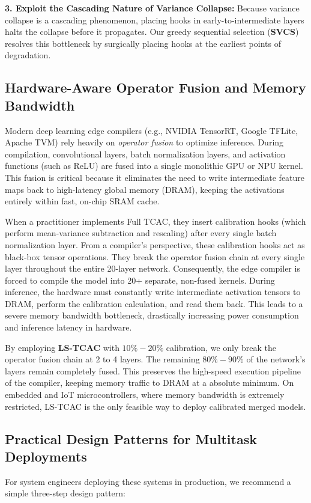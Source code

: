 \documentclass{article}
\theoremstyle{plain}
\theoremstyle{definition}
\theoremstyle{remark}
\begin{document}
\textbf{3. Exploit the Cascading Nature of Variance Collapse:} Because variance collapse is a cascading phenomenon, placing hooks in early-to-intermediate layers halts the collapse before it propagates. Our greedy sequential selection (\textbf{SVCS}) resolves this bottleneck by surgically placing hooks at the earliest points of degradation.

\subsection{Hardware-Aware Operator Fusion and Memory Bandwidth}
Modern deep learning edge compilers (e.g., NVIDIA TensorRT, Google TFLite, Apache TVM) rely heavily on \textit{operator fusion} to optimize inference. During compilation, convolutional layers, batch normalization layers, and activation functions (such as ReLU) are fused into a single monolithic GPU or NPU kernel. This fusion is critical because it eliminates the need to write intermediate feature maps back to high-latency global memory (DRAM), keeping the activations entirely within fast, on-chip SRAM cache.

When a practitioner implements Full TCAC, they insert calibration hooks (which perform mean-variance subtraction and rescaling) after every single batch normalization layer. From a compiler's perspective, these calibration hooks act as black-box tensor operations. They break the operator fusion chain at every single layer throughout the entire 20-layer network. Consequently, the edge compiler is forced to compile the model into 20+ separate, non-fused kernels. During inference, the hardware must constantly write intermediate activation tensors to DRAM, perform the calibration calculation, and read them back. This leads to a severe memory bandwidth bottleneck, drastically increasing power consumption and inference latency in hardware.

By employing \textbf{LS-TCAC} with $10\%-20\%$ calibration, we only break the operator fusion chain at 2 to 4 layers. The remaining $80\%-90\%$ of the network's layers remain completely fused. This preserves the high-speed execution pipeline of the compiler, keeping memory traffic to DRAM at a absolute minimum. On embedded and IoT microcontrollers, where memory bandwidth is extremely restricted, LS-TCAC is the only feasible way to deploy calibrated merged models.

\subsection{Practical Design Patterns for Multitask Deployments}
For system engineers deploying these systems in production, we recommend a simple three-step design pattern:
\end{document}
